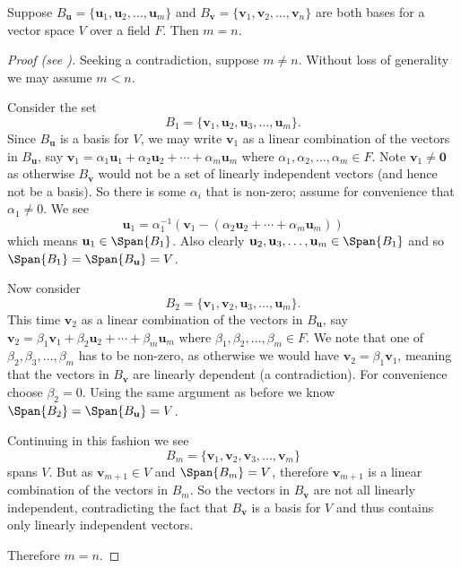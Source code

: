 \begin{theorem}\label{thrm-dimension-theorem-for-finite-bases}
    Suppose $B_\textbf{u} = \{\textbf{u}_1, \textbf{u}_2, \dots, \textbf{u}_m\}$ and $B_\textbf{v} = \{\textbf{v}_1, \textbf{v}_2, \dots, \textbf{v}_n\}$ are both bases for a vector space $V$ over a field $F$. Then $m = n$.
\end{theorem}
\begin{proof}[Proof (see {\cite[Theorem 19.1]{gallian_2016}})]
    Seeking a contradiction, suppose $m \neq n$. Without loss of generality we may assume $m < n$.

    Consider the set
    \[
        B_1 = \{\textbf{v}_1, \textbf{u}_2, \textbf{u}_3, \dots, \textbf{u}_m\}.
    \]
    Since $B_\textbf{u}$ is a basis for $V$, we may write $\textbf{v}_1$ as a linear combination of the vectors in $B_\textbf{u}$, say $\textbf{v}_1 = \alpha_1\textbf{u}_1 + \alpha_2\textbf{u}_2 + \cdots + \alpha_m\textbf{u}_m$ where $\alpha_1, \alpha_2, \dots, \alpha_m \in F$. Note $\textbf{v}_1 \neq \textbf{0}$ as otherwise $B_\textbf{v}$ would not be a set of linearly independent vectors (and hence not be a basis). So there is some $\alpha_i$ that is non-zero; assume for convenience that $\alpha_1 \neq 0$. We see
    \[
        \textbf{u}_1 = \alpha_1^{-1}\left(\textbf{v}_1 - \left(\alpha_2\textbf{u}_2 + \cdots + \alpha_m\textbf{u}_m\right)\right)
    \]
    which means $\textbf{u}_1 \in \Span{B_1}$. Also clearly $\textbf{u}_2, \textbf{u}_3, \dots, \textbf{u}_m \in \Span{B_1}$ and so $\Span{B_1} = \Span{B_\textbf{u}} = V$.

    Now consider
    \[
        B_2 = \{\textbf{v}_1, \textbf{v}_2, \textbf{u}_3, \dots, \textbf{u}_m\}.
    \]
    This time $\textbf{v}_2$ as a linear combination of the vectors in $B_\textbf{u}$, say $\textbf{v}_2 = \beta_1\textbf{v}_1 + \beta_2\textbf{u}_2 + \cdots + \beta_m\textbf{u}_m$ where $\beta_1, \beta_2, \dots, \beta_m \in F$. We note that one of $\beta_2, \beta_3, \dots, \beta_m$ has to be non-zero, as otherwise we would have $\textbf{v}_2 = \beta_1\textbf{v}_1$, meaning that the vectors in $B_\textbf{v}$ are linearly dependent (a contradiction). For convenience choose $\beta_2 = 0$. Using the same argument as before we know $\Span{B_2} = \Span{B_\textbf{u}} = V$.

    Continuing in this fashion we see
    \[
        B_m = \{\textbf{v}_1, \textbf{v}_2, \textbf{v}_3, \dots, \textbf{v}_m\}
    \]
    spans $V$. But as $\textbf{v}_{m+1} \in V$ and $\Span{B_m} = V$, therefore $\textbf{v}_{m+1}$ is a linear combination of the vectors in $B_m$. So the vectors in $B_\textbf{v}$ are not all linearly independent, contradicting the fact that $B_\textbf{v}$ is a basis for $V$ and thus contains only linearly independent vectors.

    Therefore $m = n$.
\end{proof}

